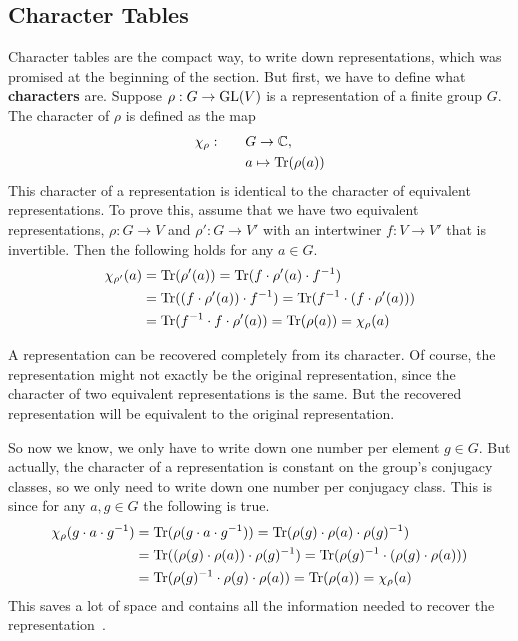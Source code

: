 \subsection{Character Tables}
\label{sec:reprep.char}

Character tables are the compact way, to write down representations, which was promised at the beginning of the section.
But first, we have to define what \textbf{characters} are.
Suppose $\rho: G \to \operatorname{GL}(V)$ is a representation of a finite group $G$.
The character of $\rho$ is defined as the map
\begin{subequations}
    \begin{align}
        \chi_\rho: \qquad & G \to \mathbb{C}, \\
        & a \mapsto \operatorname{Tr}(\rho(a))
    \end{align}
\end{subequations}
This character of a representation is identical to the character of equivalent representations.
To prove this, assume that we have two equivalent representations, $\rho: G \to V$ and $\rho': G \to V'$ with an intertwiner $f: V \to V'$ that is invertible.
Then the following holds for any $a \in G$.
\begin{subequations}
\begin{align}
    \chi_{\rho'}(a) & = \operatorname{Tr}(\rho'(a)) = \operatorname{Tr}(f \cdot \rho'(a) \cdot f^{-1}) \\
    & = \operatorname{Tr}((f \cdot \rho'(a)) \cdot f^{-1}) = \operatorname{Tr}(f^{-1} \cdot (f \cdot \rho'(a))) \\
    & = \operatorname{Tr}(f^{-1} \cdot f \cdot \rho'(a) )= \operatorname{Tr}(\rho(a)) = \chi_\rho(a)
\end{align}
\end{subequations}

A representation can be recovered completely from its character.
Of course, the representation might not exactly be the original representation, since the character of two equivalent representations is the same.
But the recovered representation will be equivalent to the original representation.

So now we know, we only have to write down one number per element $g \in G$.
But actually, the character of a representation is constant on the group's conjugacy classes, so we only need to write down one number per conjugacy class.
This is since for any $a, g \in G$ the following is true.
\begin{subequations}
\begin{align}
    \chi_\rho(g \cdot a \cdot g^{-1}) & = \operatorname{Tr}(\rho(g \cdot a \cdot g^{-1})) = \operatorname{Tr}(\rho(g) \cdot \rho(a) \cdot \rho(g)^{-1}) \\
    & = \operatorname{Tr}((\rho(g) \cdot \rho(a)) \cdot \rho(g)^{-1}) = \operatorname{Tr}(\rho(g)^{-1} \cdot (\rho(g) \cdot \rho(a))) \\
    & = \operatorname{Tr}(\rho(g)^{-1} \cdot \rho(g) \cdot \rho(a)) = \operatorname{Tr}(\rho(a)) = \chi_\rho(a) \\
\end{align}
\end{subequations}
This saves a lot of space and contains all the information needed to recover the representation~\cite{fulton2013}.

